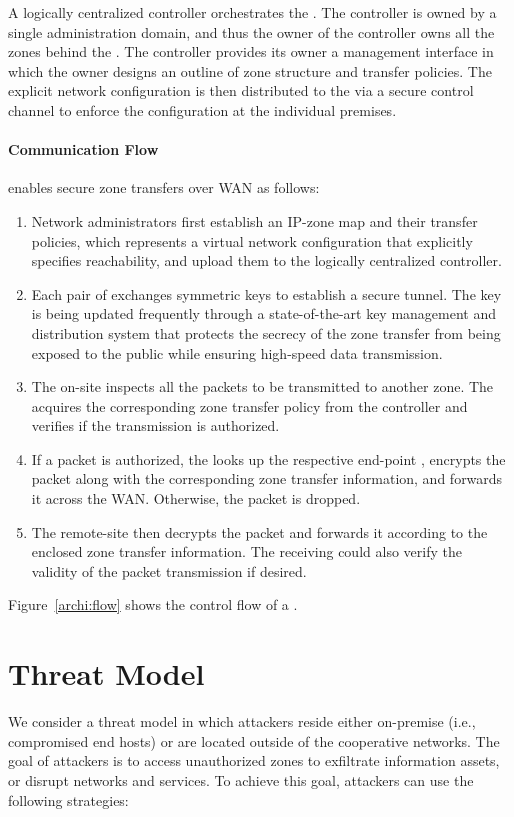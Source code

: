 A logically centralized controller orchestrates the \tps. The controller is owned
by a single administration domain, and thus the owner of the controller owns all
the zones behind the \tps. The controller provides its owner a management interface
in which the owner designs an outline of zone structure and transfer policies. The
explicit network configuration is then distributed to the \tps via a secure control
channel to enforce the configuration at the individual premises.

\paragraph{Communication Flow}

\name enables secure zone transfers over WAN as follows:

\begin{enumerate}
	\item Network administrators first establish an IP-zone map and their transfer
	      policies, which represents a virtual network configuration that explicitly
	      specifies reachability, and upload them to the logically centralized
	      controller.
	\item Each pair of \tps exchanges symmetric keys to establish a secure tunnel.
	      The key is being updated frequently through a state-of-the-art key management and
	      distribution system that protects the secrecy of the zone transfer from
	      being exposed to the public while ensuring high-speed data transmission.
	\item The on-site \tp inspects all the packets to be transmitted to another zone.
	      The \tp acquires the corresponding zone transfer policy from the controller
	      and verifies if the transmission is authorized.
	\item If a packet is authorized, the \tp looks up the respective end-point \tp,
	      encrypts the packet along with the corresponding zone transfer information,
	      and forwards it across the WAN. Otherwise, the packet is dropped.
	\item The remote-site \tp then decrypts the packet and forwards it according to
	      the enclosed zone transfer information. The receiving \tp could also verify
	      the validity of the packet transmission if desired.
\end{enumerate}

Figure~\ref{archi:flow} shows the control flow of a \tp.

\section{Threat Model}
\label{sec:threatmodel}
We consider a threat model in which attackers reside either on-premise (i.e., compromised
end hosts) or are located
outside of the cooperative networks. The goal of attackers is to access unauthorized zones
to exfiltrate information assets, or disrupt networks and services. To achieve this goal,
attackers can use the following strategies:

